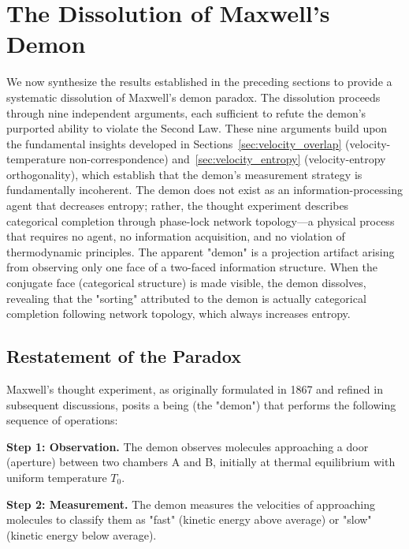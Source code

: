 \documentclass[12pt,a4paper]{article}
\theoremstyle{definition}
\theoremstyle{remark}
\begin{document}
\section{The Dissolution of Maxwell's Demon}
\label{sec:dissolution}

We now synthesize the results established in the preceding sections to provide a systematic dissolution of Maxwell's demon paradox. The dissolution proceeds through nine independent arguments, each sufficient to refute the demon's purported ability to violate the Second Law. These nine arguments build upon the fundamental insights developed in Sections~\ref{sec:velocity_overlap} (velocity-temperature non-correspondence) and~\ref{sec:velocity_entropy} (velocity-entropy orthogonality), which establish that the demon's measurement strategy is fundamentally incoherent. The demon does not exist as an information-processing agent that decreases entropy; rather, the thought experiment describes categorical completion through phase-lock network topology—a physical process that requires no agent, no information acquisition, and no violation of thermodynamic principles. The apparent "demon" is a projection artifact arising from observing only one face of a two-faced information structure. When the conjugate face (categorical structure) is made visible, the demon dissolves, revealing that the "sorting" attributed to the demon is actually categorical completion following network topology, which always increases entropy.

\subsection{Restatement of the Paradox}

Maxwell's thought experiment, as originally formulated in 1867 and refined in subsequent discussions, posits a being (the "demon") that performs the following sequence of operations:

\textbf{Step 1: Observation.} The demon observes molecules approaching a door (aperture) between two chambers A and B, initially at thermal equilibrium with uniform temperature $T_0$.

\textbf{Step 2: Measurement.} The demon measures the velocities of approaching molecules to classify them as "fast" (kinetic energy above average) or "slow" (kinetic energy below average).
\end{document}
